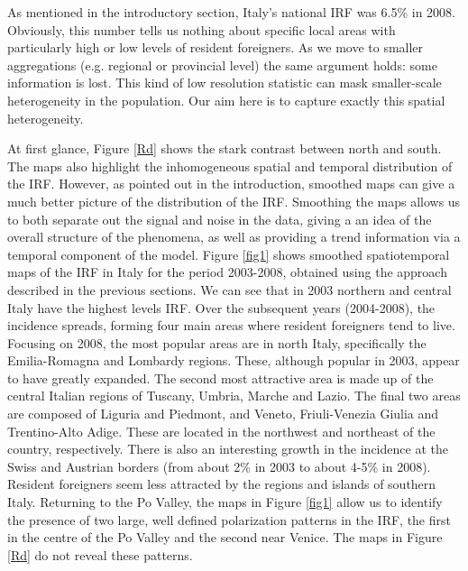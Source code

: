 \documentclass[12pt]{article}
\theoremstyle{definition}
\theoremstyle{plain}
\begin{document}
As mentioned in the introductory section, Italy's national IRF was 6.5\% in 2008. Obviously, this number tells us nothing about specific local areas with particularly high or low levels of resident foreigners. As we move to smaller aggregations (e.g. regional or provincial level) the same argument holds: some information is lost. This kind of low resolution statistic can mask smaller-scale heterogeneity in the population. Our aim here is to capture exactly this spatial heterogeneity.

At first glance, Figure \ref{Rd} shows the stark contrast between north and south. The maps also highlight the inhomogeneous spatial and temporal distribution of the IRF. However, as pointed out in the introduction, smoothed maps can give a much better picture of the distribution of the IRF. Smoothing the maps allows us to both separate out the signal and noise in the data, giving a an idea of the overall structure of the phenomena, as well as providing a trend information via a temporal component of the model. Figure \ref{fig1} shows smoothed spatiotemporal maps of the IRF in Italy for the period 2003-2008, obtained using the approach described in the previous sections. We can see that in 2003 northern and central Italy have the highest levels IRF. Over the subsequent years (2004-2008), the incidence spreads, forming four main areas where resident foreigners tend to live. Focusing on 2008, the most popular areas are in north Italy, specifically the Emilia-Romagna and Lombardy regions. These, although popular in 2003, appear to have greatly expanded. The second most attractive area is made up of the central Italian regions of Tuscany, Umbria, Marche and Lazio. The final two areas are composed of Liguria and Piedmont, and Veneto, Friuli-Venezia Giulia and Trentino-Alto Adige. These are located in the northwest and northeast of the country, respectively. There is also an interesting growth in the incidence at the Swiss and Austrian borders (from about 2\% in 2003 to about 4-5\% in 2008). Resident foreigners seem less attracted by the regions and islands of southern Italy. Returning to the Po Valley, the maps in Figure \ref{fig1} allow us to identify the presence of two large, well defined polarization patterns in the IRF, the first in the centre of the Po Valley and the second near Venice. The maps in Figure \ref{Rd} do not reveal these patterns.
\end{document}
